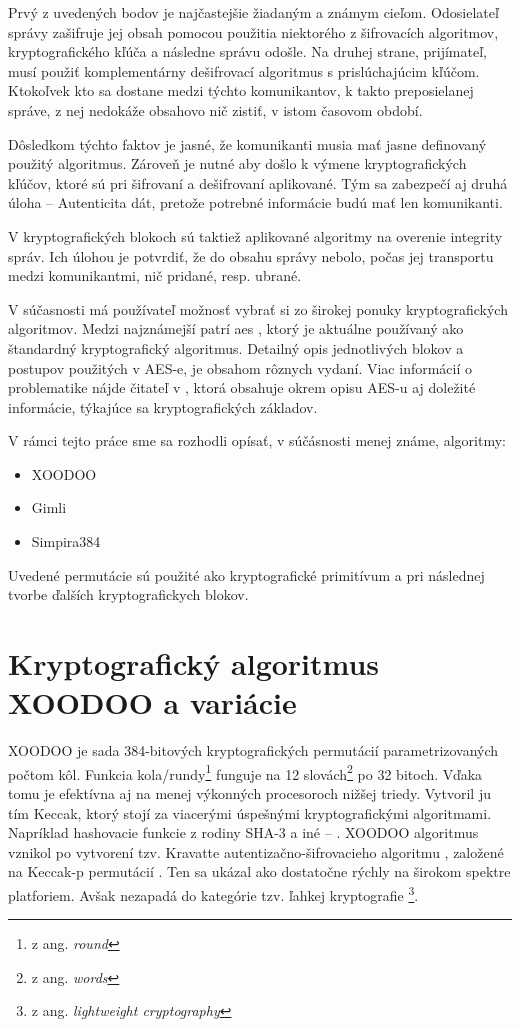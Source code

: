  Prvý z uvedených bodov je najčastejšie žiadaným a známym cieľom. Odosielateľ správy zašifruje jej obsah pomocou použitia niektorého z šifrovacích algoritmov, kryptografického kľúča a následne správu odošle. Na druhej strane, prijímateľ, musí použiť komplementárny dešifrovací algoritmus s prislúchajúcim kľúčom. Ktokoľvek kto sa dostane medzi týchto komunikantov, k takto preposielanej správe, z nej nedokáže obsahovo nič zistiť, v istom časovom období. 
 
 Dôsledkom týchto faktov je jasné, že komunikanti musia mať jasne definovaný použitý algoritmus. Zároveň je nutné aby došlo k výmene kryptografických kľúčov, ktoré sú pri šifrovaní a dešifrovaní aplikované. Tým sa zabezpečí aj druhá úloha -- Autenticita dát, pretože potrebné informácie budú mať len komunikanti. 
 
 V kryptografických blokoch sú taktiež aplikované algoritmy na overenie integrity správ. Ich úlohou je potvrdiť, že do obsahu správy nebolo, počas jej transportu medzi komunikantmi, nič pridané, resp. ubrané.
 
 V súčasnosti má používateľ možnosť vybrať si zo širokej ponuky kryptografických algoritmov. Medzi najznámejší patrí \acrshort{aes} \cite{aes}, ktorý je aktuálne používaný ako štandardný kryptografický algoritmus. Detailný opis jednotlivých blokov a postupov použitých v AES-e, je obsahom rôznych vydaní. Viac informácií o problematike nájde čitateľ v \cite{levicky}, ktorá obsahuje okrem opisu AES-u aj doležité informácie, týkajúce sa kryptografických základov.

V rámci tejto práce sme sa rozhodli opísať, v súčásnosti menej známe, algoritmy: 
\begin{itemize}
	\item XOODOO \cite{tkecak}
	\item Gimli \cite{gimli}
	\item Simpira384 \cite{simpira}
\end{itemize}  
Uvedené permutácie sú použité ako kryptografické primitívum a pri následnej tvorbe ďalších kryptografickych blokov. 

\section{Kryptografický algoritmus XOODOO a variácie} 
XOODOO je sada 384-bitových kryptografických permutácií parametrizovaných počtom kôl. Funkcia kola/rundy\footnote{z ang. \textit{round}} funguje na 12 slovách\footnote{z ang. \textit{words}} po 32 bitoch. Vďaka tomu je efektívna aj na menej výkonných procesoroch nižšej triedy. Vytvoril ju tím Keccak, ktorý stojí za viacerými úspešnými kryptografickými algoritmami. Napríklad hashovacie funkcie z rodiny SHA-3 a iné -- \cite{kecsup}. XOODOO algoritmus vznikol po vytvorení tzv. Kravatte autentizačno-šifrovacieho algoritmu \cite{kravatte}, založené na Keccak-p permutácií \cite{keccakp}. Ten sa ukázal ako dostatočne rýchly na širokom spektre platforiem. Avšak nezapadá do kategórie tzv. ľahkej kryptografie \footnote{z ang. \textit{lightweight cryptography}}.

